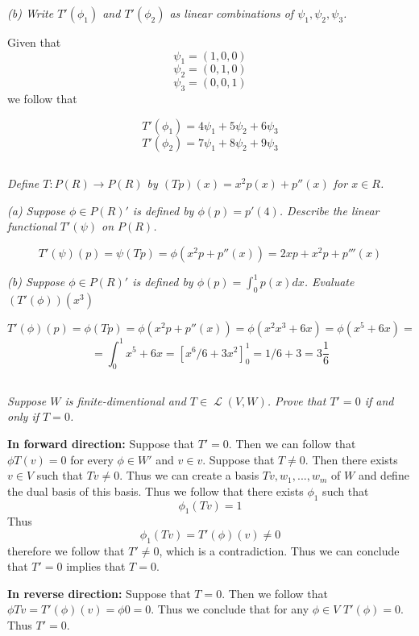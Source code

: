 \documentclass[11pt,oneside,titlepage]{book}
\DeclareMathOperator \map {\mathcal {L}}
\begin{document}
\textit{(b) Write $T'(\phi_1)$ and $T'(\phi_2)$ as linear combinations of
  $\psi_1, \psi_2, \psi_3$.}

Given that
$$\psi_1 = (1, 0, 0)$$
$$\psi_2 = (0, 1, 0)$$
$$\psi_3 = (0, 0, 1)$$
we follow that

$$T'(\phi_1) = 4 \psi_1 + 5 \psi_2 + 6 \psi_3$$
$$T'(\phi_2) = 7 \psi_1 + 8 \psi_2 + 9 \psi_3$$

\subsection{}

\textit{Define $T: P(R) \to P(R)$ by $(Tp)(x) = x^2p(x) + p''(x)$ for $x \in R$.}

\textit{(a) Suppose $\phi \in P(R)'$ is defined by $\phi(p) = p'(4)$. Describe the linear
  functional $T'(\psi)$ on $P(R)$.}

$$T'(\psi)(p) = \psi (Tp) = \phi(x^2p + p''(x)) = 2xp + x^2p + p'''(x)$$

\textit{(b) Suppose $\phi \in P(R)'$ is defined by $\phi(p) = \int_0^1{p(x) dx}$. Evaluate
  $(T'(\phi))(x^3)$}

$$T'(\phi)(p) = \phi(Tp) = \phi( x^2p + p''(x)) = \phi( x^2 x^3 + 6x) = \phi(x^5 + 6x) = $$
$$ =  \int_0^1{x^5 + 6x} = [x^6/6 + 3x^2]_0^1 = 1/6 + 3 = 3 \frac{1}{6}$$

\subsection{}

\textit{Suppose $W$ is finite-dimentional and $T \in \map(V, W)$. Prove that $T' = 0$
  if and only if $T = 0$.}

\textbf{In forward direction: }
Suppose that $T' = 0$. Then we can follow that $\phi T (v) = 0$ for every
$\phi \in W'$ and $v \in v$. Suppose that $T \neq 0$. Then there exists $v \in V$ such that
$Tv \neq 0$. Thus we can create a basis $Tv, w_1, ..., w_m$ of $W$ and define the dual
basis of this basis. Thus we follow that there exists $\phi_1$ such that 
$$\phi_1(Tv) = 1$$
Thus
$$\phi_1(Tv) = T'(\phi)(v) \neq 0$$
therefore we follow that $T' \neq 0$, which is a contradiction. Thus we can conclude that
$T' = 0$ implies that $T = 0$.

\textbf{In reverse direction: }
Suppose that $T = 0$. Then we follow that $\phi Tv = T'(\phi)(v) = \phi 0 = 0$. Thus we
conclude that for any $\phi \in V$ $T'(\phi) = 0$. Thus $T' = 0$.

\subsection{}
\end{document}
